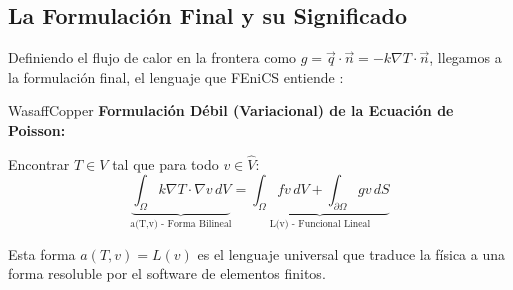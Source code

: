 \subsection{La Formulación Final y su Significado}
Definiendo el flujo de calor en la frontera como $g = \vec{q} \cdot \vec{n} = -k \nabla T \cdot \vec{n}$, llegamos a la formulación final, el lenguaje que FEniCS entiende \cite{logg2012}:
\begin{keybox}{WasaffCopper}
    \textbf{Formulación Débil (Variacional) de la Ecuación de Poisson:}
    
    Encontrar $T \in V$ tal que para todo $v \in \hat{V}$:
    \begin{equation}
        \underbrace{\int_{\Omega} k \nabla T \cdot \nabla v \, dV}_{\text{a(T,v) - Forma Bilineal}} = \underbrace{\int_{\Omega} f v \, dV + \int_{\partial \Omega} g v \, dS}_{\text{L(v) - Funcional Lineal}}
    \end{equation}
\end{keybox}
Esta forma $a(T,v) = L(v)$ es el lenguaje universal que traduce la física a una forma resoluble por el software de elementos finitos.
